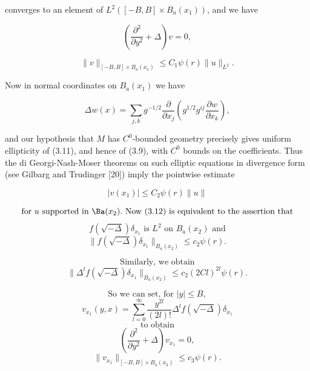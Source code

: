 converges to an element of $L^2([-B,B]\times B_a(x_1))$, and we have

\begin{equation}\tag{3.9}
\left(\frac{\partial^2}{\partial y^2}+\Delta\right)v=0,
\end{equation}

\begin{equation}\tag{3.10}
\|v\|_{[-B,B]\times B_a(x_1)}\le C_1\psi(r)\|u\|_{L^2}.
\end{equation}

Now in normal coordinates on $B_a(x_1)$ we have

\begin{equation}\tag{3.11}
\Delta w(x)=\sum_{j,k} g^{-1/2}\frac{\partial}{\partial x_j}
\left(g^{1/2}g^{ij}\frac{\partial w}{\partial x_k}\right),
\end{equation}

and our hypothesis that $M$ has $C^0$-bounded geometry precisely gives uniform ellipticity of (3.11), and hence of (3.9), with $C^0$ bounds on the coefficients. Thus the di Georgi-Nash-Moser theorems on such elliptic equations in divergence form (see Gilbarg and Trudinger [20]) imply the pointwise estimate

\begin{equation}\tag{3.12}
|v(x_1)|\le C_2\psi(r)\|u\|
\end{equation}

\[
\text{for }u\text{ supported in }\Ba(x_2).\ \text{Now }(3.12)\text{ is equivalent to the assertion that}
\]
\[
f(\sqrt{-\Delta})\delta_{x_1}\text{ is }L^2\text{ on }B_a(x_2)\text{ and}
\]
\begin{equation}\tag{3.13}
 \bigl\|f(\sqrt{-\Delta})\delta_{x_1}\bigr\|_{B_a(x_2)}\le c_2\psi(r).
\end{equation}

\[
\text{Similarly, we obtain}
\]
\begin{equation}\tag{3.14}
 \bigl\|\Delta^l f(\sqrt{-\Delta})\delta_{x_1}\bigr\|_{B_a(x_2)}\le c_2(2Cl)^{2l}\psi(r).
\end{equation}

\[
\text{So we can set, for }|y|\le B,
\]
\begin{equation}\tag{3.15}
 v_{x_1}(y,x)=\sum_{l=0}^{\infty}\frac{y^{2l}}{(2l)!}\Delta^l f(\sqrt{-\Delta})\delta_{x_1}
\end{equation}
\[
\text{to obtain}
\]
\begin{equation}\tag{3.16}
 \left(\frac{\partial^2}{\partial y^2}+\Delta\right)v_{x_1}=0,
\end{equation}
\begin{equation}\tag{3.17}
 \bigl\|v_{x_1}\bigr\|_{[-B,B]\times B_a(x_2)}\le c_3\psi(r).
\end{equation}

